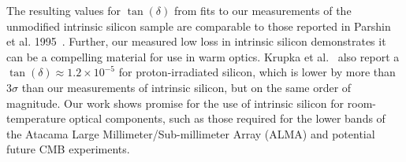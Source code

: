 The resulting values for $\tan(\delta)$ from fits to our measurements of the unmodified intrinsic silicon sample are comparable to those reported in Parshin et al. 1995~\cite{parshin}. Further, our measured low loss in intrinsic silicon demonstrates it can be a compelling material for use in warm optics. Krupka et al.~\cite{KRUPKA201676} also report a $\tan(\delta) \approx 1.2\times10^{-5}$ for proton-irradiated silicon, which is lower by more than $3\sigma$ than our measurements of intrinsic silicon, but on the same order of magnitude. Our work shows promise for the use of intrinsic silicon for room-temperature optical components, such as those required for the lower bands of the Atacama Large Millimeter/Sub-millimeter Array (ALMA) and potential future CMB experiments.


